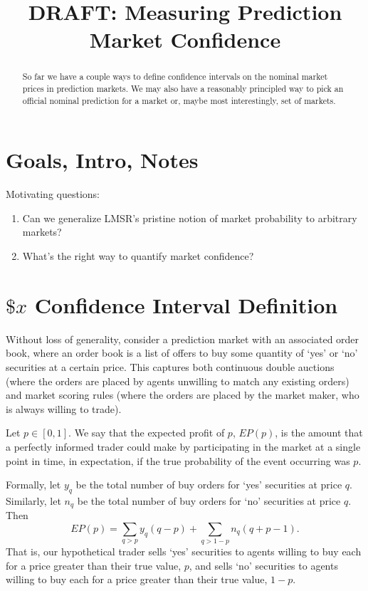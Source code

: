 \documentclass{article}
\title{DRAFT: Measuring Prediction Market Confidence}
\author{}
\begin{document}
\maketitle

\begin{abstract}
So far we have a couple ways to define confidence intervals on the nominal market prices in prediction markets.
We may also have a reasonably principled way to pick an official nominal prediction for a market or, maybe most interestingly, set of markets.
\end{abstract}


\section{Goals, Intro, Notes}

Motivating questions:

\begin{enumerate}
\item Can we generalize LMSR's pristine notion of market probability to arbitrary markets?
\item What's the right way to quantify market confidence?
\end{enumerate}


\section{$\$x$ Confidence Interval Definition}

Without loss of generality, consider a prediction market with an associated order book, where an order book is a list of offers to buy some quantity of `yes' or `no' securities at a certain price. 
This captures both continuous double auctions (where the orders are placed by agents unwilling to match any existing orders) and market scoring rules (where the orders are placed by the market maker, who is always willing to trade).

Let $p \in [0,1]$. 
We say that the expected profit of $p$, $EP(p)$, is the amount that a perfectly informed trader could make by participating in the market at a single point in time, in expectation, if the true probability of the event occurring was $p$.

Formally, let $y_q$ be the total number of buy orders for `yes' securities at price $q$. 
Similarly, let $n_q$ be the total number of buy orders for `no' securities at price $q$. 
Then
\[ EP(p) = \sum_{q>p} y_q(q-p) + \sum_{q>1-p} n_q(q+p-1). \]
That is, our hypothetical trader sells `yes' securities to agents willing to buy each for a price greater than their true value, $p$, and sells `no' securities to agents willing to buy each for a price greater than their true value, $1-p$.
\end{document}

